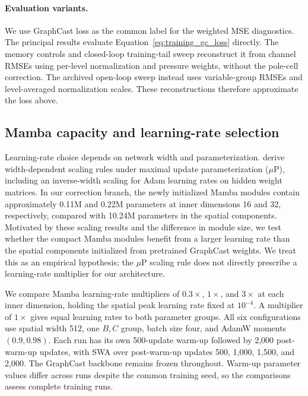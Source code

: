 \documentclass{article}
\begin{document}
\paragraph{{Evaluation variants.}}
{We use GraphCast loss as the common label for the weighted MSE diagnostics. The principal results evaluate Equation~\ref{eq:training_gc_loss} directly. The memory controls and closed-loop training-tail sweep reconstruct it from channel RMSEs using per-level normalization and pressure weights, without the pole-cell correction. The archived open-loop sweep instead uses variable-group RMSEs and level-averaged normalization scales. These reconstructions therefore approximate the loss above.}



\subsection{\texorpdfstring{{Mamba capacity and learning-rate selection}}{Mamba capacity and learning-rate selection}}
\label{sec:training_sensitivity}
{Learning-rate choice depends on network width and parameterization. \citet{yang2022tensorprogramsv} derive width-dependent scaling rules under maximal update parameterization ($\mu$P), including an inverse-width scaling for Adam learning rates on hidden weight matrices. In our correction branch, the newly initialized Mamba modules contain approximately 0.11M and 0.22M parameters at inner dimensions 16 and 32, respectively, compared with 10.24M parameters in the spatial components. Motivated by these scaling results and the difference in module size, we test whether the compact Mamba modules benefit from a larger learning rate than the spatial components initialized from pretrained GraphCast weights. We treat this as an empirical hypothesis; the $\mu$P scaling rule does not directly prescribe a learning-rate multiplier for our architecture.}

{We compare Mamba learning-rate multipliers of $0.3\times$, $1\times$, and $3\times$ at each inner dimension, holding the spatial peak learning rate fixed at $10^{-4}$. A multiplier of $1\times$ gives equal learning rates to both parameter groups. All six configurations use spatial width 512, one $B,C$ group, batch size four, and AdamW moments $(0.9,0.98)$. Each run has its own 500-update warm-up followed by 2,000 post-warm-up updates, with SWA over post-warm-up updates 500, 1,000, 1,500, and 2,000. The GraphCast backbone remains frozen throughout. Warm-up parameter values differ across runs despite the common training seed, so the comparisons assess complete training runs.}
\end{document}
